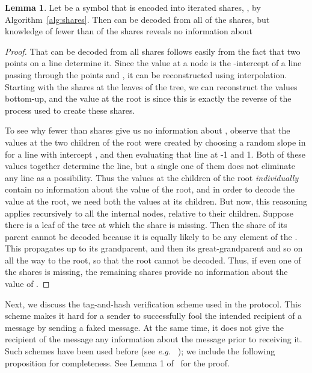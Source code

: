 \documentclass[12pt]{article}
\theoremstyle{definition}
\newtheorem{lemma}[theorem]{Lemma}
\newcommand{\eg}{\emph{e.g. }}
\begin{document}
\begin{lemma}\label{lem:shares}
Let  be a symbol that is encoded into  iterated 
shares, , by Algorithm~\ref{alg:shares}. Then 
can be decoded from all  of the shares, but knowledge of fewer than 
 of the shares reveals no information about 
\end{lemma}
\begin{proof}
That  can be decoded from all  shares follows easily from the fact 
that two points on a line determine it. Since the value at a node is the 
-intercept of a line passing through the points 
 and , it 
can be reconstructed using interpolation. Starting with the shares 
 at the leaves of the tree, we can reconstruct the 
values bottom-up, and the value at the root is  since this is 
exactly the reverse of the process used to create these shares.

To see why fewer than  shares give us no information about , 
observe that the values at the two children of the root were created by 
choosing a random slope in  for a line with  intercept , 
and then 
evaluating that line at -1 and 1. Both of these values together determine 
the line, but a single one of them does not eliminate any line as a 
possibility. Thus the values at the children of the root \emph{individually} 
contain no information about the value of the root, and in order to decode 
the value at the root, we need both the values at its children. But now, this 
reasoning applies recursively to all the internal nodes, relative to their 
children. Suppose there is a leaf of the tree at which the share is 
missing. Then the share of its parent cannot be decoded because it is 
equally likely to be any element of the . This propagates up to its 
grandparent, and then its great-grandparent and so on all the way to the root, 
so that the root cannot be decoded.  
Thus, if even one of the shares is missing, the remaining shares provide 
no information about the value of .
\end{proof}

Next, we discuss the tag-and-hash verification scheme used in the protocol. 
This scheme makes it hard for a sender to successfully fool the intended  
recipient of a message by sending a faked message. At the same time, it 
does not give the recipient of the message any information about the message 
prior to receiving it. Such schemes have been used before (see \eg 
~\cite{wegman1981new, rabin1989verifiable, kol2008games}); we include 
the following proposition for completeness.  See Lemma 1 of~\cite{rabin1989verifiable} for the proof.
\end{document}
